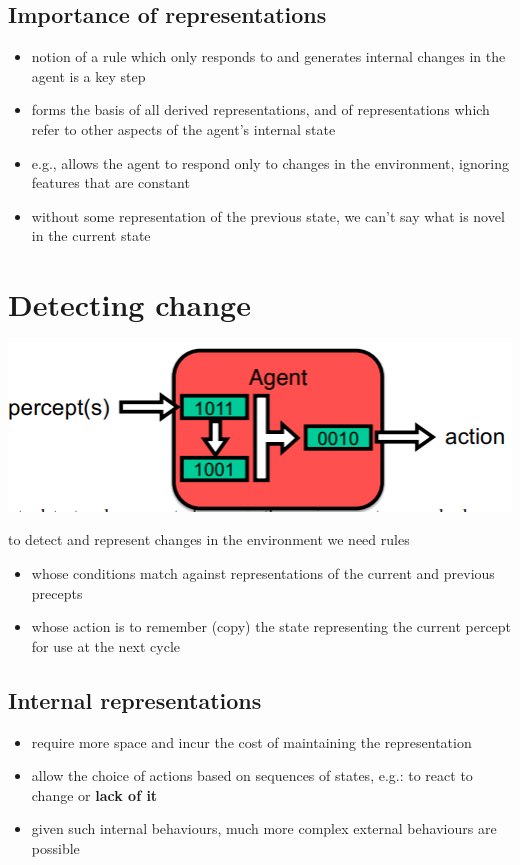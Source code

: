 \documentclass{article}
\begin{document}
\subsection{Importance of representations}
\begin{itemize}
  \item notion of a rule which only responds to and generates internal changes in the agent is a key step 
  \item forms the basis of all derived representations, and of representations which refer to other aspects of the agent’s internal state 
  \item e.g., allows the agent to respond only to changes in the environment, ignoring features that are constant 
  \item without some representation of the previous state, we can’t say what is novel in the current state
\end{itemize}

\section{Detecting change}

\begin{center}
  \includegraphics[scale=0.5]{agent_change.png}
\end{center}

\begin{flushleft}
to detect and represent changes in the environment we need rules
\begin{itemize}
  \item whose conditions match against representations of the current and previous precepts 
  \item whose action is to remember (copy) the state representing the current percept for use at the next cycle
\end{itemize}
\end{flushleft}

\subsection{Internal representations}
\begin{itemize}
  \item require more space and incur the cost of maintaining the representation 
  \item allow the choice of actions based on sequences of states, e.g.: to react to change or \textbf{lack of it}
  \item given such internal behaviours, much more complex external behaviours are possible
\end{itemize}
\end{document}
